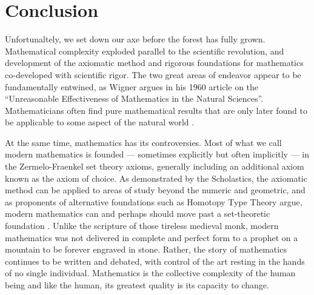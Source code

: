 \documentclass[12pt]{article}
\begin{document}
\section{Conclusion}

Unfortunaltely, we set down our axe
before the forest has fully grown.
Mathematical complexity exploded
parallel to the scientific revolution,
and development of the axiomatic method
and rigorous foundations for mathematics
co-developed with scientific rigor.
The two great areas of endeavor
appear to be fundamentally entwined,
as Wigner argues in his 1960 article
on the ``Unreasonable Effectiveness
of Mathematics in the Natural Sciences''.
Mathematicians often find pure mathematical results
that are only later found to be applicable
to some aspect of the natural world \cite{wigner}.

At the same time,
mathematics has its controversies.
Most of what we call modern mathematics
is founded ---
sometimes explicitly but often implicitly ---
in the Zermelo-Fraenkel set theory axioms,
generally including an additional axiom
known as the axiom of choice.
As demonstrated by the Scholastics,
the axiomatic method can be applied to
areas of study beyond the numeric and geometric,
and as proponents of alternative foundations
such as Homotopy Type Theory argue,
modern mathematics can and perhaps should
move past a set-theoretic foundation \cite{ladyman}.
Unlike the scripture of
those tireless medieval monk,
modern mathematics was not delivered
in complete and perfect form
to a prophet on a mountain
to be forever engraved in stone.
Rather, the story of mathematics
continues to be written and debated,
with control of the art resting
in the hands of
no single individual.
Mathematics is the collective complexity
of the human being
and like the human,
its greatest quality
is its capacity to change.







\end{document}
